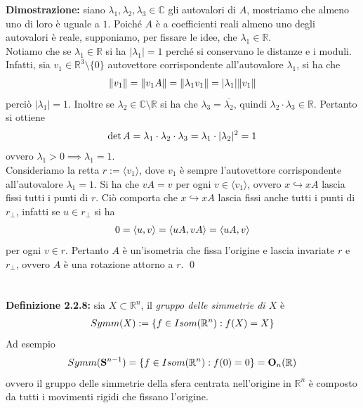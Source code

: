 \documentclass{article}
\begin{document}
\textbf{Dimostrazione:} siano $\lambda_1, \lambda_2, \lambda_3 \in \mathbb{C}$ gli autovalori di $A$, mostriamo che almeno uno di loro è uguale a $1$. Poiché $A$ è a coefficienti reali almeno uno degli autovalori è reale, supponiamo, per fissare le idee, che $\lambda_1 \in \mathbb{R}$. \\
Notiamo che se $\lambda_1 \in \mathbb{R}$ si ha $|\lambda_1| = 1$ perché si conservano le distanze e i moduli. Infatti, sia $v_1 \in \mathbb{R}^3 \setminus \{ 0 \}$ autovettore corrispondente all'autovalore $\lambda_1$, si ha che
\begin{gather}
    \| v_1 \| = \| v_1A \| = \| \lambda_1 v_1 \| = |\lambda_1|\| v_1 \| \notag
\end{gather}
perciò $|\lambda_1| = 1$. Inoltre se $\lambda_2 \in \mathbb{C} \setminus \mathbb{R}$ si ha che $\lambda_3 = \overline{\lambda_2}$, quindi $\lambda_2 \cdot \lambda_3 \in \mathbb{R}$. Pertanto si ottiene
\begin{gather}
    \det A = \lambda_1 \cdot \lambda_2 \cdot \lambda_3 = \lambda_1 \cdot |\lambda_2|^2 = 1 \notag
\end{gather}
ovvero $\lambda_1 > 0 \implies \lambda_1 = 1$. \\
Consideriamo la retta $r := \langle v_1 \rangle$, dove $v_1$ è sempre l'autovettore corrispondente all'autovalore $\lambda_1 = 1$. Si ha che $vA = v$ per ogni $v \in \langle v_1 \rangle$, ovvero $x \hookrightarrow xA$ lascia fissi tutti i punti di $r$. Ciò comporta che $x \hookrightarrow xA$ lascia fissi anche tutti i punti di $r_\perp$, infatti se $u \in r_\perp$ si ha
\begin{gather}
    0 = \langle u, v \rangle = \langle uA, vA \rangle = \langle uA, v \rangle \notag
\end{gather}
per ogni $v \in r$. Pertanto $A$ è un'isometria che fissa l'origine e lascia invariate $r$ e $r_\perp$, ovvero $A$ è una rotazione attorno a $r$. \qed \\ \\ \\
\textbf{Definizione 2.2.8:} sia $X \subset \mathbb{R}^n$, il \textit{gruppo delle simmetrie di $X$} è
\begin{gather}
    Symm(X) := \{ f \in Isom(\mathbb{R}^n) : f(X) = X \} \notag
\end{gather}
Ad esempio
\begin{gather}
    Symm(\mathbf{S}^{n - 1}) = \{ f \in Isom(\mathbb{R}^n) : f(0) = 0 \} = \mathbf{O}_n(\mathbb{R}) \notag
\end{gather}
ovvero il gruppo delle simmetrie della sfera centrata nell'origine in $\mathbb{R}^n$ è composto da tutti i movimenti rigidi che fissano l'origine. \\ \\ \\
\end{document}
